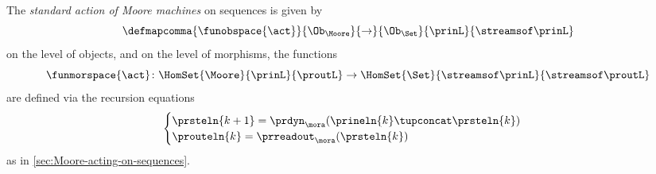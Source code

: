 \begin{definition}
    \label{def:moore-standard-action-on-sequences}
    The \emph{standard action of Moore machines} on sequences is given by
    \begin{equation}
        \defmapcomma{\funobspace{\act}}
        {\Ob_{\Moore}}
        {\to}
        {\Ob_{\Set}}
        {\prinL}
        {\streamsof\prinL}
    \end{equation}
    on the level of objects, and on the level of morphisms, the functions
    \begin{equation}
        \funmorspace{\act} \colon  \HomSet{\Moore}{\prinL}{\proutL} \to \HomSet{\Set}{\streamsof\prinL }{\streamsof\proutL}
    \end{equation}
    are defined via the recursion equations
    \begin{equation}
        \begin{cases}
            \prsteln{k+1} = \prdyn_\mora(\prineln{k} \tupconcat \prsteln{k}) \\
            \prouteln{k}   = \prreadout_\mora(\prsteln{k})
        \end{cases}
    \end{equation}
    as in \cref{sec:Moore-acting-on-sequences}.
\end{definition}

